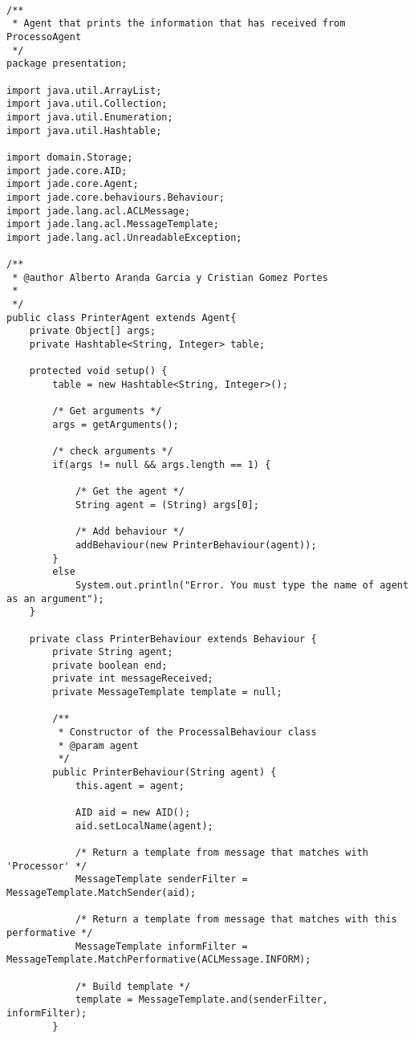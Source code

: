 \documentclass{pre-tfg}
\begin{document}
\begin{lstlisting}[caption=Código que pinta el número de anuncios encontrados en una página en forma de tabla,style=java]

/**
 * Agent that prints the information that has received from ProcessoAgent
 */
package presentation;

import java.util.ArrayList;
import java.util.Collection;
import java.util.Enumeration;
import java.util.Hashtable;

import domain.Storage;
import jade.core.AID;
import jade.core.Agent;
import jade.core.behaviours.Behaviour;
import jade.lang.acl.ACLMessage;
import jade.lang.acl.MessageTemplate;
import jade.lang.acl.UnreadableException;

/**
 * @author Alberto Aranda Garcia y Cristian Gomez Portes
 *
 */
public class PrinterAgent extends Agent{
	private Object[] args;
	private Hashtable<String, Integer> table;
	
	protected void setup() {
		table = new Hashtable<String, Integer>();
		
		/* Get arguments */
		args = getArguments();

		/* check arguments */
		if(args != null && args.length == 1) {
			
			/* Get the agent */
			String agent = (String) args[0];

			/* Add behaviour */
			addBehaviour(new PrinterBehaviour(agent));
		}
		else
			System.out.println("Error. You must type the name of agent as an argument");
	}
	
	private class PrinterBehaviour extends Behaviour {
		private String agent;
		private boolean end;
		private int messageReceived;
		private MessageTemplate template = null;
		
		/**
		 * Constructor of the ProcessalBehaviour class
		 * @param agent
		 */
		public PrinterBehaviour(String agent) {
			this.agent = agent;
			
			AID aid = new AID();
			aid.setLocalName(agent);

			/* Return a template from message that matches with 'Processor' */
			MessageTemplate senderFilter = MessageTemplate.MatchSender(aid);

			/* Return a template from message that matches with this performative */
			MessageTemplate informFilter = MessageTemplate.MatchPerformative(ACLMessage.INFORM);

			/* Build template */
			template = MessageTemplate.and(senderFilter, informFilter);
		}
		

\end{lstlisting}
\end{document}

